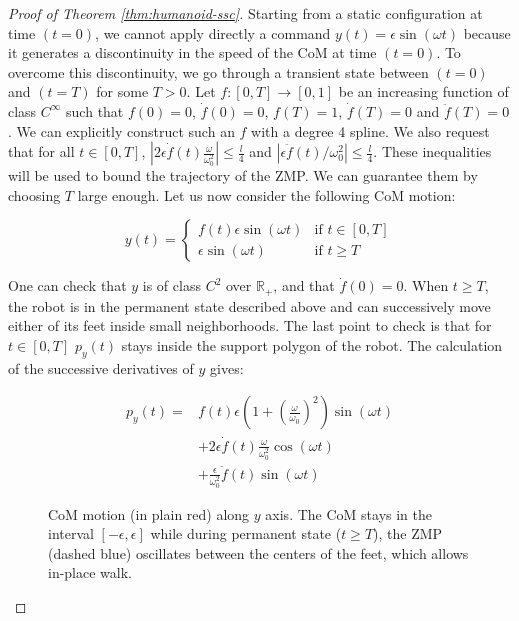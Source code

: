 \documentclass{article}
\begin{document}
\begin{proof}[Proof of Theorem \ref{thm:humanoid-ssc}]
Starting from a static configuration at time $(t=0)$, we cannot apply
directly  a  command  $y(t)  =  \epsilon \sin(\omega  t)$  because  it
generates  a discontinuity  in the  speed of  the CoM  at time $(t=0)$. To
overcome this  discontinuity, we go through a  transient state between
$(t=0)$ and  $(t=T)$ for some  $T >0$. Let  $f:[0,T] \rightarrow
[0,1]$  be an  increasing function of class $C^\infty$  such  that  $f(0)  =  0$,
$\dot{f}(0) = 0$, $f(T) =  1$, $\dot{f}(T) = 0$ and $\ddot{f}(T)
=  0$.  We can explicitly  construct  such  an $f$   with  a degree  4
spline.   We   also   request   that   for  all   $t   \in   [0,T]$,
$|2\epsilon\dot{f}(t)\frac{\omega}{\omega_0^2}|   \leq  \frac{l}{4}$
and   $|\epsilon\ddot{f}(t)/\omega_0^2|  \leq   \frac{l}{4}$.  These
inequalities  will be  used  to bound  the  trajectory of  the  ZMP. We  can
guarantee them by  choosing $T$ large enough. Let  us now consider the
following CoM motion:

\[
y(t) = \left\{
\begin{array}{ll}
f(t)\epsilon\sin(\omega t) 
& \text{if } t\in [0,T]
\\ 
\epsilon\sin(\omega t) 
& \text{if } t \geq T \end{array}
\right.
\]

One can  check that $y$  is of class $C^2$ over  $\mathbb{R}_+$, and
that $\dot{f}(0) = 0$. When $t\geq T$, the robot is in the permanent
state described above  and can successively move either of its 
feet  inside small neighborhoods.
The  last point to check
is that for $t \in  [0,T]$ $p_y(t)$ stays inside the support polygon
of the robot. The calculation of the successive derivatives of $y$ gives:

\[
\begin{array}{cl}
p_y(t) = &  f(t) \epsilon (1 + \left(\frac{\omega}{\omega_0}\right)^2)
\sin (\omega  t) \\ &  + 2\epsilon \dot{f}(t)\frac{\omega}{\omega_0^2}
\cos  (\omega t)  \\ &  +  \frac{\epsilon}{\omega_0^2}\ddot{f}(t) \sin
(\omega t)
\end{array}
\]



\begin{figure}
\centering


\caption{CoM motion (in plain red) along $y$ axis.  The CoM stays in the interval
  $[-\epsilon,\epsilon]$ while during  permanent state ($t \geq T$),
  the ZMP (dashed blue) oscillates between the centers of the feet, which allows
  in-place walk.}
\label{fig:zmp-inplace}
\end{figure}


\end{proof}
\end{document}
